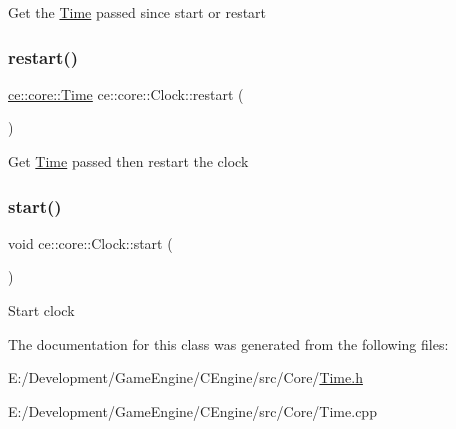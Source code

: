 Get the \hyperlink{structce_1_1core_1_1_time}{Time} passed since start or restart \mbox{\label{classce_1_1core_1_1_clock_ad2f5f8ff6d8881ccd8626249232be0f2}} 
\subsubsection{\texorpdfstring{restart()}{restart()}}
{\footnotesize\ttfamily \hyperlink{structce_1_1core_1_1_time}{ce\+::core\+::\+Time} ce\+::core\+::\+Clock\+::restart (\begin{DoxyParamCaption}{ }\end{DoxyParamCaption})}

Get \hyperlink{structce_1_1core_1_1_time}{Time} passed then restart the clock \mbox{\label{classce_1_1core_1_1_clock_ae8ba6571cfacee77bf76e795969f772a}} 
\subsubsection{\texorpdfstring{start()}{start()}}
{\footnotesize\ttfamily void ce\+::core\+::\+Clock\+::start (\begin{DoxyParamCaption}{ }\end{DoxyParamCaption})}

Start clock 

The documentation for this class was generated from the following files\+:\begin{DoxyCompactItemize}
\item 
E\+:/\+Development/\+Game\+Engine/\+C\+Engine/src/\+Core/\hyperlink{_time_8h}{Time.\+h}\item 
E\+:/\+Development/\+Game\+Engine/\+C\+Engine/src/\+Core/Time.\+cpp\end{DoxyCompactItemize}
